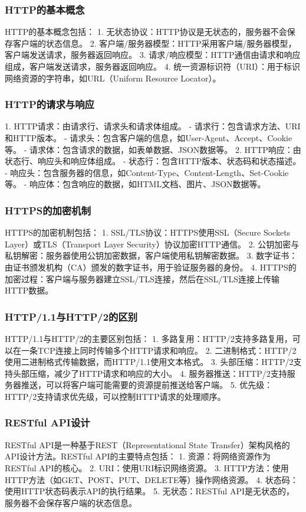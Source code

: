 \documentclass{book}
\begin{document}
\subsubsection{HTTP的基本概念}
HTTP的基本概念包括：
1. 无状态协议：HTTP协议是无状态的，服务器不会保存客户端的状态信息。
2. 客户端/服务器模型：HTTP采用客户端/服务器模型，客户端发送请求，服务器返回响应。
3. 请求/响应模型：HTTP通信由请求和响应组成，客户端发送请求，服务器返回响应。
4. 统一资源标识符（URI）：用于标识网络资源的字符串，如URL（Uniform Resource Locator）。
\subsubsection{HTTP的请求与响应}
1. HTTP请求：由请求行、请求头和请求体组成。
   - 请求行：包含请求方法、URI和HTTP版本。
   - 请求头：包含客户端的信息，如User-Agent、Accept、Cookie等。
   - 请求体：包含请求的数据，如表单数据、JSON数据等。
2. HTTP响应：由状态行、响应头和响应体组成。
   - 状态行：包含HTTP版本、状态码和状态描述。
   - 响应头：包含服务器的信息，如Content-Type、Content-Length、Set-Cookie等。
   - 响应体：包含响应的数据，如HTML文档、图片、JSON数据等。
\subsubsection{HTTPS的加密机制}
HTTPS的加密机制包括：
1. SSL/TLS协议：HTTPS使用SSL（Secure Sockets Layer）或TLS（Transport Layer Security）协议加密HTTP通信。
2. 公钥加密与私钥解密：服务器使用公钥加密数据，客户端使用私钥解密数据。
3. 数字证书：由证书颁发机构（CA）颁发的数字证书，用于验证服务器的身份。
4. HTTPS的加密过程：客户端与服务器建立SSL/TLS连接，然后在SSL/TLS连接上传输HTTP数据。
\subsubsection{HTTP/1.1与HTTP/2的区别}
HTTP/1.1与HTTP/2的主要区别包括：
1. 多路复用：HTTP/2支持多路复用，可以在一条TCP连接上同时传输多个HTTP请求和响应。
2. 二进制格式：HTTP/2使用二进制格式传输数据，而HTTP/1.1使用文本格式。
3. 头部压缩：HTTP/2支持头部压缩，减少了HTTP请求和响应的大小。
4. 服务器推送：HTTP/2支持服务器推送，可以将客户端可能需要的资源提前推送给客户端。
5. 优先级：HTTP/2支持请求优先级，可以控制HTTP请求的处理顺序。
\subsubsection{RESTful API设计}
RESTful API是一种基于REST（Representational State Transfer）架构风格的API设计方法。RESTful API的主要特点包括：
1. 资源：将网络资源作为RESTful API的核心。
2. URI：使用URI标识网络资源。
3. HTTP方法：使用HTTP方法（如GET、POST、PUT、DELETE等）操作网络资源。
4. 状态码：使用HTTP状态码表示API的执行结果。
5. 无状态：RESTful API是无状态的，服务器不会保存客户端的状态信息。
\end{document}
